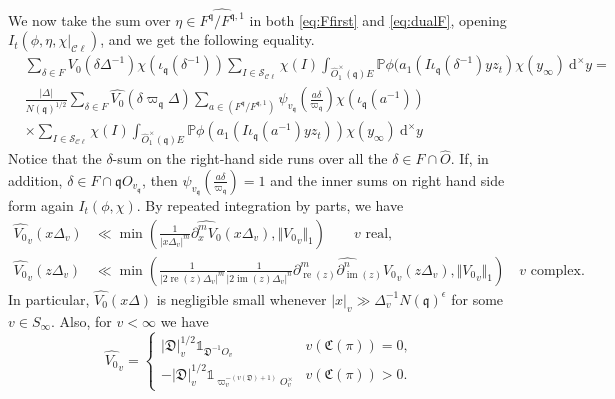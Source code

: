 \documentclass[a4paper,11pt]{amsart}
\theoremstyle{definition}
\newcommand{\cl}{\mathcal{C}\ell}
\newcommand{\imag}{\operatorname{im}}
\newcommand{\real}{\operatorname{re}}
\begin{document}
We now take the sum over $\eta\in \widehat{F^{\mathfrak{q}}/F^{\mathfrak{q},1}}$ in both \eqref{eq:Ffirst} and \eqref{eq:dualF}, opening $I_t(\phi,\eta,\chi|_{\cl})$, and we get the following equality. 
\begin{align*}
    &\sum_{\delta \in F}V_0(\delta \Delta^{-1})\chi(\iota_{\mathfrak{q}}(\delta^{-1}))\sum_{I \in \mathcal{S}_{\cl}}\chi(I)\int_{\widehat{O}^{\times}_1(\mathfrak{q})E}\mathbb{P}\phi(a_1(I\iota_\mathfrak{q}(\delta^{-1})yz_t)\chi(y_{\infty})\ \mathrm{d}^{\times}y = \\&\frac{\vert{\Delta}\vert}{N(\mathfrak{q})^{1/2}}\sum_{\delta \in F}\widehat{V_0}\left(\delta\varpi_\mathfrak{q}\Delta\right) 
    \sum_{a\in (F^{\mathfrak{q}}/F^{\mathfrak{q},1}) 
    }\psi_{v_{\mathfrak{q}}}\left(\frac{a\delta}{\varpi_{\mathfrak{q}}}\right)\chi(\iota_{\mathfrak{q}}(a^{-1}))\\&\times \sum_{I\in \mathcal{S}_{\cl}}\chi(I)\int_{\widehat{O}^{\times}_1(\mathfrak{q})E}\mathbb{P}\phi(a_1(I\iota_\mathfrak{q}(a^{-1})yz_t))\chi(y_{\infty})\ \mathrm{d}^{\times}y
\end{align*}
Notice that the $\delta$-sum on the right-hand side runs over all the $\delta \in F\cap \widehat{O}$. If, in addition, $\delta \in F\cap \mathfrak{q}O_{v_{\mathfrak{q}}}$, then $\psi_{v_{\mathfrak{q}}}\left(\frac{a\delta }{\varpi_{\mathfrak{q}}} \right)=1$ and the inner sums on right hand side form again   
$ I_t(\phi,\chi)$. 
By repeated integration by parts, we have
\begin{align*}
    \widehat{V_0}_v(x\Delta_v) &\ll \min(\frac{1}{\vert{x\Delta_v}\vert^m}\widehat{\partial_x^mV_0}(x\Delta_v),\Vert{{V_0}_v}\Vert_1) \qquad v \text{ real},\\
    \widehat{V_0}_v(z\Delta_v) &\ll \min(\frac{1}{\vert{2\real(z)\Delta_v}\vert^m}\frac{1}{\vert{2\imag(z)\Delta_v}\vert^n}\widehat{\partial^m_{\real(z)}\partial^n_{\imag(z)}{V_0}_v}(z\Delta_v),\Vert{{V_0}_v}\Vert_1)\quad v \text{ complex}.
\end{align*}
In particular, $\widehat{V_0}(x\Delta)$ is negligible small whenever $\vert{x}\vert_v\gg \Delta_v^{-1}N(\mathfrak{q})^{\epsilon}$ for some $v \in S_{\infty}$.
Also, for $v<\infty$ we have 
\begin{equation*}
   \widehat{V_0}_v =\begin{cases} \vert \mathfrak{D}\vert_v^{1/2}
    \mathbb{1}_{\mathfrak{D}^{-1}O_v} &v(\mathfrak{C}(\pi))=0,\\
    -\vert \mathfrak{D}\vert_v^{1/2}\mathbb{1}_{\varpi_{v}^{-(v(\mathfrak{D})+1)}O_v^{\times}}
    &v(\mathfrak{C}(\pi))>0.\end{cases}
\end{equation*}
\end{document}
